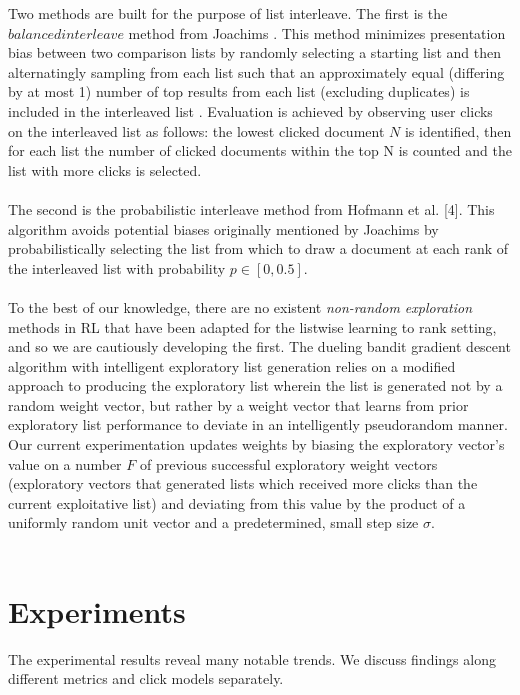 \documentclass{acm_proc_article-sp}
\begin{document}
Two methods are built for the purpose of list interleave. The first is the $balanced interleave$ method from Joachims \cite{joachims}. This method minimizes presentation bias between two comparison lists by randomly selecting a starting list and then alternatingly sampling from each list such that an approximately equal (differing by at most 1) number of top results from each list (excluding duplicates) is included in the interleaved list \cite{Joachims}. Evaluation is achieved by observing user clicks on the interleaved list as follows: the lowest clicked document $N$ is identified, then for each list the number of clicked documents within the top N is counted and the list with more clicks is selected. \\ \\
The second is the probabilistic interleave method from Hofmann et al. [4]. This algorithm avoids potential biases originally mentioned by Joachims \cite{joachims} by probabilistically selecting the list from which to draw a document at each rank of the interleaved list with probability $p \in  [0, 0.5]$\cite{hofmann}. \\ \\
To the best of our knowledge, there are no existent \emph{non-random exploration} methods in RL that have been adapted for the listwise learning to rank setting, and so we are cautiously developing the first. The dueling bandit gradient descent algorithm with intelligent exploratory list generation relies on a modified approach to producing the exploratory list wherein the list is generated not by a random weight vector, but rather by a weight vector that learns from prior exploratory list performance to deviate in an intelligently pseudorandom manner. Our current experimentation updates weights by biasing the exploratory vector’s value on a number $F$ of previous successful exploratory weight vectors (exploratory vectors that generated lists which received more clicks than the current exploitative list) and deviating from this value by the product of a uniformly random unit vector and a predetermined, small step size $\sigma$. \\ \\

\section{Experiments}
The experimental results reveal many notable trends.  We discuss findings along different metrics and click models separately.
\end{document}
